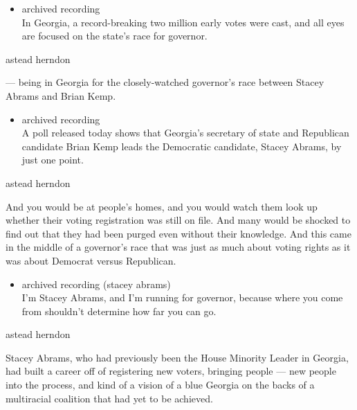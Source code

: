 \begin{itemize}
\tightlist
\item
  archived recording\\
  In Georgia, a record-breaking two million early votes were cast, and
  all eyes are focused on the state's race for governor.
\end{itemize}

astead herndon

--- being in Georgia for the closely-watched governor's race between
Stacey Abrams and Brian Kemp.

\begin{itemize}
\tightlist
\item
  archived recording\\
  A poll released today shows that Georgia's secretary of state and
  Republican candidate Brian Kemp leads the Democratic candidate, Stacey
  Abrams, by just one point.
\end{itemize}

astead herndon

And you would be at people's homes, and you would watch them look up
whether their voting registration was still on file. And many would be
shocked to find out that they had been purged even without their
knowledge. And this came in the middle of a governor's race that was
just as much about voting rights as it was about Democrat versus
Republican.

\begin{itemize}
\tightlist
\item
  archived recording (stacey abrams)\\
  I'm Stacey Abrams, and I'm running for governor, because where you
  come from shouldn't determine how far you can go.
\end{itemize}

astead herndon

Stacey Abrams, who had previously been the House Minority Leader in
Georgia, had built a career off of registering new voters, bringing
people --- new people into the process, and kind of a vision of a blue
Georgia on the backs of a multiracial coalition that had yet to be
achieved.

